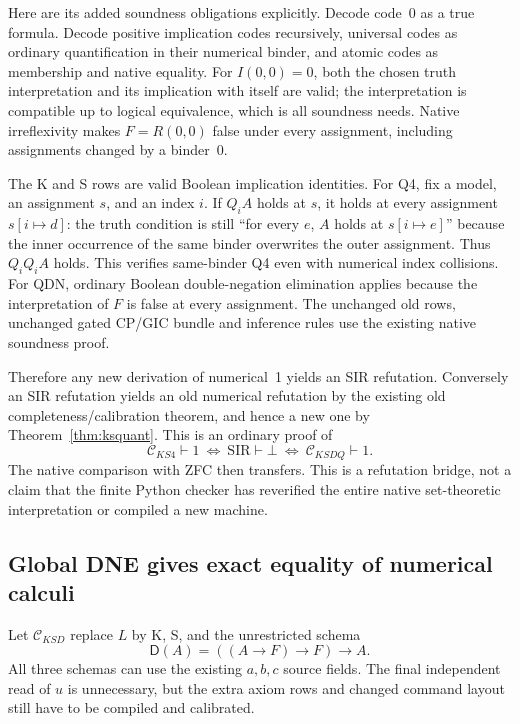 Here are its added soundness obligations explicitly. Decode code~0 as a
true formula. Decode positive implication codes recursively, universal
codes as ordinary quantification in their numerical binder, and atomic
codes as membership and native equality. For $I(0,0)=0$, both the
chosen truth interpretation and its implication with itself are valid;
the interpretation is compatible up to logical equivalence, which is
all soundness needs. Native irreflexivity makes $F=R(0,0)$ false under
every assignment, including assignments changed by a binder~0.

The K and S rows are valid Boolean implication identities. For Q4,
fix a model, an assignment $s$, and an index $i$. If $Q_i A$ holds at
$s$, it holds at every assignment $s[i\mapsto d]$: the truth condition
is still ``for every $e$, $A$ holds at $s[i\mapsto e]$'' because the
inner occurrence of the same binder overwrites the outer assignment.
Thus $Q_iQ_iA$ holds. This verifies same-binder Q4 even with numerical
index collisions. For QDN, ordinary Boolean double-negation elimination
applies because the interpretation of $F$ is false at every assignment.
The unchanged old rows, unchanged gated CP/GIC bundle and inference
rules use the existing native soundness proof.

Therefore any new derivation of numerical~1 yields an SIR refutation.
Conversely an SIR refutation yields an old numerical refutation by the
existing old completeness/calibration theorem, and hence a new one by
Theorem~\ref{thm:ksquant}. This is an ordinary proof of
\[
 \mathcal C_{KS4}\vdash1\ \Longleftrightarrow\ \mathrm{SIR}\vdash\bot
 \ \Longleftrightarrow\ \mathcal C_{KSDQ}\vdash1.
\]
The native comparison with ZFC then transfers. This is a refutation
bridge, not a claim that the finite Python checker has reverified the
entire native set-theoretic interpretation or compiled a new machine.

\subsection{Global DNE gives exact equality of numerical calculi}

Let $\mathcal C_{KSD}$ replace $L$ by K, S, and the unrestricted schema
\[
 \mathsf D(A)=((A\to F)\to F)\to A.
\]
All three schemas can use the existing $a,b,c$ source fields. The final
independent read of $u$ is unnecessary, but the extra axiom rows and
changed command layout still have to be compiled and calibrated.

